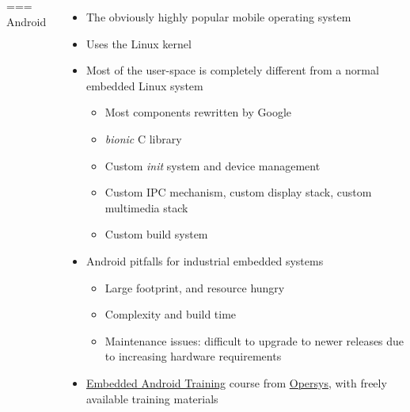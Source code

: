 \begin{columns}
=== {Android}
  \begin{itemize}
  \item The obviously highly popular mobile operating system
  \item Uses the Linux kernel
  \item Most of the user-space is completely different from a normal
    embedded Linux system
    \begin{itemize}
    \item Most components rewritten by Google
    \item {\em bionic} C library
    \item Custom {\em init} system and device management
    \item Custom IPC mechanism, custom display stack, custom
      multimedia stack
    \item Custom build system
    \end{itemize}
  \item Android pitfalls for industrial embedded systems
    \begin{itemize}
    \item Large footprint, and resource hungry
    \item Complexity and build time
    \item Maintenance issues: difficult to upgrade to newer releases
      due to increasing hardware requirements
    \end{itemize}
  \item
    \href{https://www.opersys.com/training/embedded-android-training/}{Embedded
      Android Training} course from
    \href{https://www.opersys.com}{Opersys}, with freely available
    training materials
  \end{itemize}



\end{columns}
